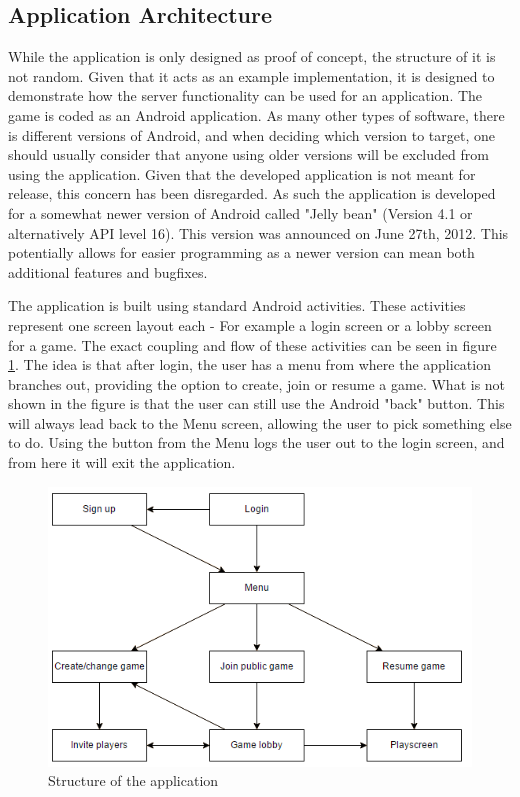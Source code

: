 \subsection{Application Architecture}
\label{sec:application_architecture}
While the application is only designed as proof of concept, the structure of it is not random. Given that it acts as an example implementation, it is designed to demonstrate how the server functionality can be used for an application. The game is coded as an Android application. As many other types of software, there is different versions of Android, and when deciding which version to target, one should usually consider that anyone using older versions will be excluded from using the application. Given that the developed application is not meant for release, this concern has been disregarded. As such the application is developed for a somewhat newer version of Android called "Jelly bean" (Version 4.1 or alternatively API level 16). This version was announced on June 27th, 2012\cite{jelly-bean}. This potentially allows for easier programming as a newer version can mean both additional features and bugfixes.

The application is built using standard Android activities. These activities represent one screen layout each - For example a login screen or a lobby screen for a game.\cite{android-activity} The exact coupling and flow of these activities can be seen in figure \ref{fig:appstructure}. The idea is that after login, the user has a menu from where the application branches out, providing the option to create, join or resume a game. What is not shown in the figure is that the user can still use the Android "back" button. This will always lead back to the Menu screen, allowing the user to pick something else to do. Using the button from the Menu logs the user out to the login screen, and from here it will exit the application.

\begin{figure}[H]
\centering
\includegraphics[width=\textwidth]{billeder/appstructure.png}
\caption{Structure of the application}
\label{fig:appstructure}
\end{figure}


